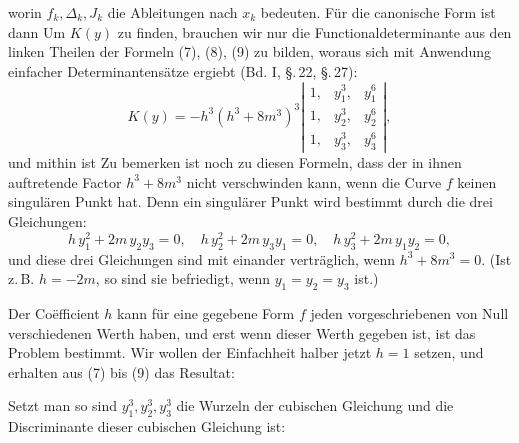 worin $f_k,\Delta_k,J_k$ die Ableitungen nach $x_k$ bedeuten. Für die canonische Form ist dann
Um $K(y)$ zu finden, brauchen wir nur die Functionaldeterminante aus den linken Theilen der Formeln (7), (8), (9) zu bilden, woraus sich mit Anwendung einfacher Determinantensätze ergiebt (Bd. I, \S.\,22, \S.\,27):
\[
K(y) = -h^3(h^3+8m^3)^3 \left|\begin{array}{ccc} 1, & y_1^3, & y_1^6 \\ 1, & y_2^3, & y_2^6 \\ 1, & y_3^3, & y_3^6 \end{array}\right|,
\]
und mithin ist
Zu bemerken ist noch zu diesen Formeln, dass der in ihnen auftretende Factor $h^3+8m^3$ nicht verschwinden kann, wenn die Curve $f$ keinen singulären Punkt hat. Denn ein singulärer Punkt wird bestimmt durch die drei Gleichungen:
\[
h\,y_1^2 + 2m\,y_2y_3 = 0,\quad h\,y_2^2 + 2m\,y_3y_1 = 0,\quad h\,y_3^2 + 2m\,y_1y_2 = 0,
\]
und diese drei Gleichungen sind mit einander verträglich, wenn $h^3+8m^3=0$. (Ist z.\,B. $h=-2m$, so sind sie befriedigt, wenn $y_1=y_2=y_3$ ist.)

Der Co\"efficient $h$ kann für eine gegebene Form $f$ jeden vorgeschriebenen von Null verschiedenen Werth haben, und erst wenn dieser Werth gegeben ist, ist das Problem bestimmt. Wir wollen der Einfachheit halber jetzt $h=1$ setzen, und erhalten aus (7) bis (9) das Resultat:

Setzt man
so sind $y_1^3,y_2^3,y_3^3$ die Wurzeln der cubischen Gleichung
und die Discriminante dieser cubischen Gleichung ist:
